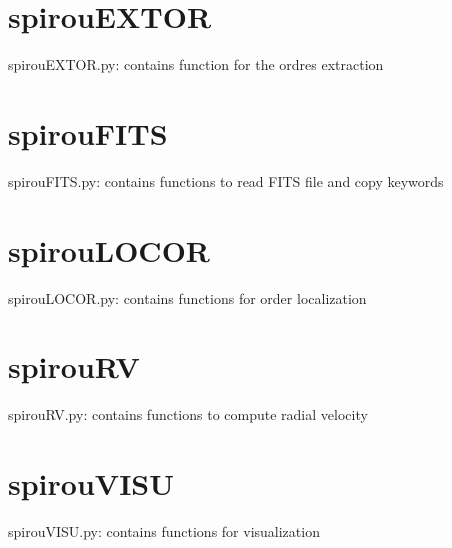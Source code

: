 \section{spirouEXTOR}
spirouEXTOR.py: contains function for the ordres extraction
\section{spirouFITS}
spirouFITS.py: contains functions to read FITS file and copy keywords
\section{spirouLOCOR}
spirouLOCOR.py: contains functions for order localization
\section{spirouRV}
spirouRV.py: contains functions to compute radial velocity
\section{spirouVISU}
spirouVISU.py: contains functions for visualization